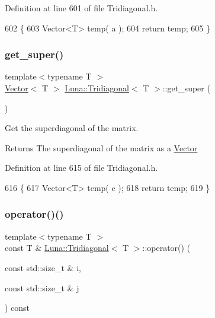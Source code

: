 Definition at line 601 of file Tridiagonal.\+h.


\begin{DoxyCode}
602   \{
603     Vector<T> temp( a );
604     \textcolor{keywordflow}{return} temp;
605   \}
\end{DoxyCode}
\mbox{\label{classLuna_1_1Tridiagonal_aeb826920a890dec25c7817418ccaa8cb}} 
\subsubsection{\texorpdfstring{get\+\_\+super()}{get\_super()}}
{\footnotesize\ttfamily template$<$typename T $>$ \\
\hyperlink{classLuna_1_1Vector}{Vector}$<$ T $>$ \hyperlink{classLuna_1_1Tridiagonal}{Luna\+::\+Tridiagonal}$<$ T $>$\+::get\+\_\+super (\begin{DoxyParamCaption}{ }\end{DoxyParamCaption})\hspace{0.3cm}{\ttfamily [inline]}}



Get the superdiagonal of the matrix. 

\begin{DoxyReturn}{Returns}
The superdiagonal of the matrix as a \hyperlink{classLuna_1_1Vector}{Vector} 
\end{DoxyReturn}


Definition at line 615 of file Tridiagonal.\+h.


\begin{DoxyCode}
616   \{
617     Vector<T> temp( c );
618     \textcolor{keywordflow}{return} temp;
619   \}
\end{DoxyCode}
\mbox{\label{classLuna_1_1Tridiagonal_aa94d8c34b275eb5f6de7a840b78b843f}} 
\subsubsection{\texorpdfstring{operator()()}{operator()()}\hspace{0.1cm}{\footnotesize\ttfamily [1/2]}}
{\footnotesize\ttfamily template$<$typename T $>$ \\
const T \& \hyperlink{classLuna_1_1Tridiagonal}{Luna\+::\+Tridiagonal}$<$ T $>$\+::operator() (\begin{DoxyParamCaption}\item[{const std\+::size\+\_\+t \&}]{i,  }\item[{const std\+::size\+\_\+t \&}]{j }\end{DoxyParamCaption}) const\hspace{0.3cm}{\ttfamily [inline]}}



